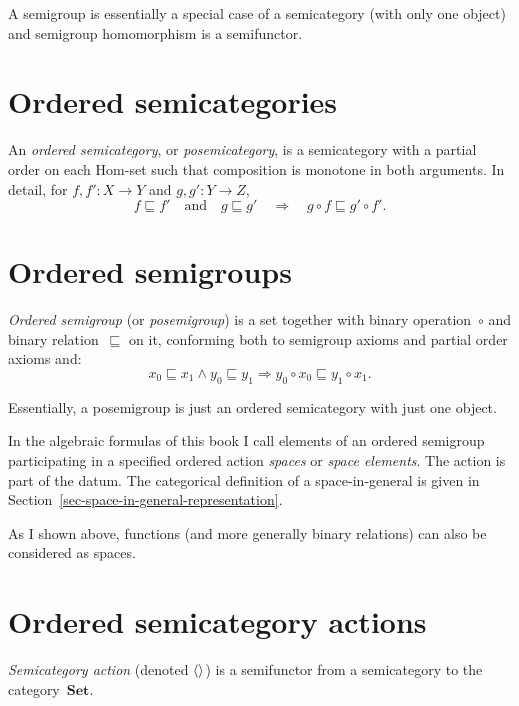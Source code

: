 \begin{note}
A semigroup is essentially a special case of a semicategory (with only one object) and semigroup homomorphism is a semifunctor.
\end{note}

\chapter{Ordered semicategories}

\begin{defn}
An \emph{ordered semicategory}, or \emph{posemicategory}, is a
semicategory with a partial order on each Hom-set such that
composition is monotone in both arguments. In detail, for
$f,f':X\to Y$ and $g,g':Y\to Z$,
\[
 f\sqsubseteq f'\quad\text{and}\quad g\sqsubseteq g'
 \quad\Longrightarrow\quad g\circ f\sqsubseteq g'\circ f'.
\]
\end{defn}

\chapter{Ordered semigroups}

\begin{defn}
\emph{Ordered semigroup} (or \emph{posemigroup}) is a set together with binary operation~$\circ$ and binary relation~$\sqsubseteq$ on it, conforming both to semigroup axioms and partial order axioms and:
\[ x_0\sqsubseteq x_1\land y_0\sqsubseteq y_1\Rightarrow y_0\circ x_0\sqsubseteq y_1\circ x_1. \]
\end{defn}

Essentially, a posemigroup is just an ordered semicategory with just one object.

In the algebraic formulas of this book I call elements of an ordered
semigroup participating in a specified ordered action \emph{spaces} or
\emph{space elements}. The action is part of the datum. The categorical
definition of a space-in-general is given in
Section~\ref{sec-space-in-general-representation}.

As I shown above, functions (and more generally binary relations) can also be considered as spaces.

\chapter{Ordered semicategory actions}\label{chap-osa}

\begin{defn}
\emph{Semicategory action} (denoted $\left\langle \right\rangle$) is a semifunctor from a semicategory to the category~$\mathbf{Set}$.
\end{defn}

